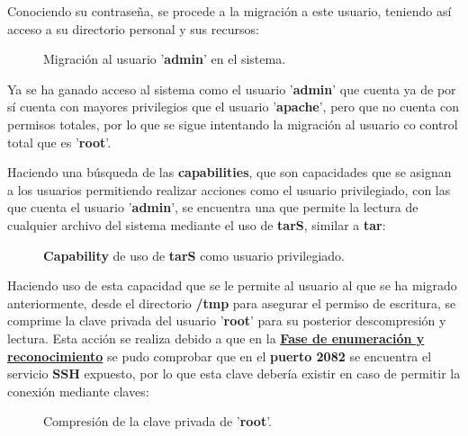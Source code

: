\documentclass[a4paper]{article} %
\begin{document}
  Conociendo su contraseña, se procede a la migración a este usuario, teniendo así acceso a su directorio personal y sus recursos:

\begin{figure}[h]
    \centering
    \setlength{\fboxrule}{0.8pt}
    \caption{Migración al usuario '\textbf{admin}' en el sistema.}
 \end{figure}

  Ya se ha ganado acceso al sistema como el usuario '\textbf{admin}' que cuenta ya de por sí cuenta con mayores privilegios que el usuario '\textbf{apache}', pero que no cuenta con permisos totales, por lo que se sigue intentando la migración al usuario co control total que es '\textbf{root}'.

  Haciendo una búsqueda de las \textbf{capabilities}, que son capacidades que se asignan a los usuarios permitiendo realizar acciones como el usuario privilegiado, con las que cuenta el usuario '\textbf{admin}', se encuentra una que permite la lectura de cualquier archivo del sistema mediante el uso de \textbf{tarS}, similar a \textbf{tar}:

    \begin{figure}[h]
      \centering
      \setlength{\fboxrule}{0.8pt}
      \caption{\textbf{Capability} de uso de \textbf{tarS} como usuario privilegiado.}
    \end{figure}

    \clearpage

    Haciendo uso de esta capacidad que se le permite al usuario al que se ha migrado anteriormente, desde el directorio \textbf{/tmp} para asegurar el permiso de escritura, se comprime la clave privada del usuario '\textbf{root}' para su posterior descompresión y lectura. Esta acción se realiza debido a que en la \hyperref[sec:reconocimiento]{\textbf{Fase de enumeración y reconocimiento}} se pudo comprobar que en el \textbf{puerto 2082} se encuentra el servicio \textbf{SSH} expuesto, por lo que esta clave debería existir en caso de permitir la conexión mediante claves:

    \begin{figure}[h]
      \centering
      \setlength{\fboxrule}{0.8pt}
      \caption{Compresión de la clave privada de '\textbf{root}'.}
    \end{figure}
\end{document}
